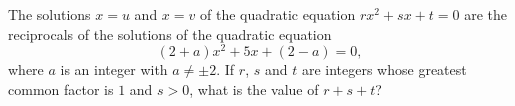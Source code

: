The solutions $x=u$ and $x=v$ of the quadratic equation $rx^2+sx+t=0$ are the reciprocals of the solutions of the quadratic equation
\[(2+a)x^2+5x+(2-a)=0,\]
where $a$ is an integer with $a\ne\pm2$. If $r$, $s$ and $t$ are integers whose greatest common factor is $1$ and $s>0$, what is the value of $r+s+t$?
